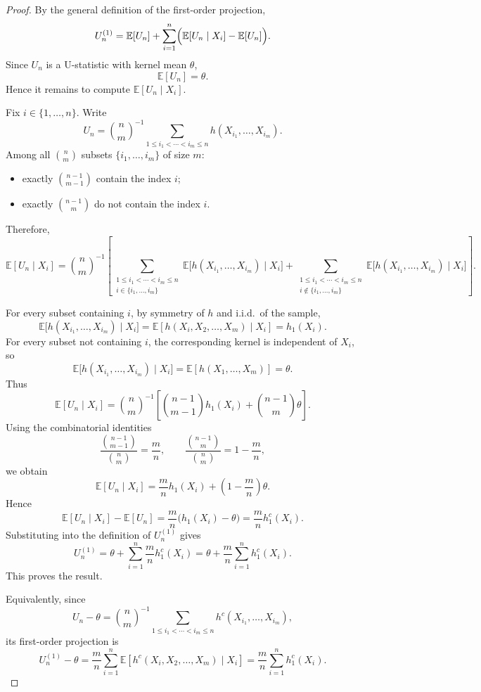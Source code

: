 \documentclass[11pt]{article}
\theoremstyle{definition}
\begin{document}
\begin{proof}
By the general definition of the first-order projection,
\[
U_n^{(1)}
=
\mathbb{E}[U_n]
+
\sum_{i=1}^n\Bigl(\mathbb{E}[U_n\mid X_i]-\mathbb{E}[U_n]\Bigr).
\]
Since $U_n$ is a U-statistic with kernel mean $\theta$,
\[
\mathbb{E}[U_n]=\theta.
\]
Hence it remains to compute $\mathbb{E}[U_n\mid X_i]$.

Fix $i\in\{1,\dots,n\}$. Write
\[
U_n
=
\binom{n}{m}^{-1}
\sum_{1\le i_1<\cdots<i_m\le n}
h(X_{i_1},\dots,X_{i_m}).
\]
Among all $\binom{n}{m}$ subsets $\{i_1,\dots,i_m\}$ of size $m$:

\begin{itemize}
\item exactly $\binom{n-1}{m-1}$ contain the index $i$;
\item exactly $\binom{n-1}{m}$ do not contain the index $i$.
\end{itemize}

Therefore,
\[
\mathbb{E}[U_n\mid X_i]
=
\binom{n}{m}^{-1}
\left[
\sum_{\substack{1\le i_1<\cdots<i_m\le n\\ i\in\{i_1,\dots,i_m\}}}
\mathbb{E}\bigl[h(X_{i_1},\dots,X_{i_m})\mid X_i\bigr]
+
\sum_{\substack{1\le i_1<\cdots<i_m\le n\\ i\notin\{i_1,\dots,i_m\}}}
\mathbb{E}\bigl[h(X_{i_1},\dots,X_{i_m})\mid X_i\bigr]
\right].
\]

For every subset containing $i$, by symmetry of $h$ and i.i.d.\ of the sample,
\[
\mathbb{E}\bigl[h(X_{i_1},\dots,X_{i_m})\mid X_i\bigr]
=
\mathbb{E}[h(X_i,X_2,\dots,X_m)\mid X_i]
=
h_1(X_i).
\]
For every subset not containing $i$, the corresponding kernel is independent of $X_i$, so
\[
\mathbb{E}\bigl[h(X_{i_1},\dots,X_{i_m})\mid X_i\bigr]
=
\mathbb{E}[h(X_1,\dots,X_m)]
=
\theta.
\]
Thus
\[
\mathbb{E}[U_n\mid X_i]
=
\binom{n}{m}^{-1}
\left[
\binom{n-1}{m-1} h_1(X_i)
+
\binom{n-1}{m}\theta
\right].
\]
Using the combinatorial identities
\[
\frac{\binom{n-1}{m-1}}{\binom{n}{m}}=\frac{m}{n},
\qquad
\frac{\binom{n-1}{m}}{\binom{n}{m}}=1-\frac{m}{n},
\]
we obtain
\[
\mathbb{E}[U_n\mid X_i]
=
\frac{m}{n}h_1(X_i)+\left(1-\frac{m}{n}\right)\theta.
\]
Hence
\[
\mathbb{E}[U_n\mid X_i]-\mathbb{E}[U_n]
=
\frac{m}{n}\bigl(h_1(X_i)-\theta\bigr)
=
\frac{m}{n}h_1^c(X_i).
\]
Substituting into the definition of $U_n^{(1)}$ gives
\[
U_n^{(1)}
=
\theta+\sum_{i=1}^n \frac{m}{n}h_1^c(X_i)
=
\theta+\frac{m}{n}\sum_{i=1}^n h_1^c(X_i).
\]
This proves the result.

Equivalently, since
\[
U_n-\theta
=
\binom{n}{m}^{-1}
\sum_{1\le i_1<\cdots<i_m\le n}
h^c(X_{i_1},\dots,X_{i_m}),
\]
its first-order projection is
\[
U_n^{(1)}-\theta
=
\frac{m}{n}\sum_{i=1}^n \mathbb{E}[h^c(X_i,X_2,\dots,X_m)\mid X_i]
=
\frac{m}{n}\sum_{i=1}^n h_1^c(X_i).
\]
\end{proof}
\end{document}
